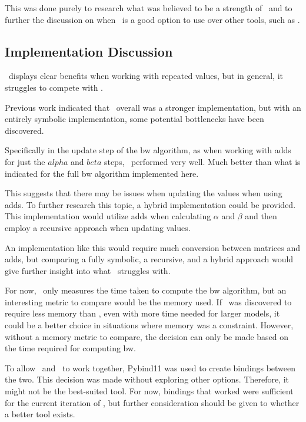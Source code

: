 This was done purely to research what was believed to be a strength of \Cupaal\ and to further the discussion on when \Cupaal\ is a good option to use over other tools, such as \Jajapy.


\subsection{Implementation Discussion} \label{subsec:implementation_discussion}
\Cupaal\ displays clear benefits when working with repeated values, but in general, it struggles to compete with \Jajapy.

Previous work indicated that \Cupaal\ overall was a stronger implementation, but with an entirely symbolic implementation, some potential bottlenecks have been discovered.

Specifically in the update step of the \gls{bw} algorithm, as when working with \glspl{add} for just the $alpha$ and $beta$ steps, \Cupaal\ performed very well.
Much better than what is indicated for the full \gls{bw} algorithm implemented here.

This suggests that there may be issues when updating the values when using \glspl{add}.
To further research this topic, a hybrid implementation could be provided.
This implementation would utilize \glspl{add} when calculating $\alpha$ and $\beta$ and then employ a recursive approach when updating values.

An implementation like this would require much conversion between matrices and \glspl{add}, but comparing a fully symbolic, a recursive, and a hybrid approach would give further insight into what \Cupaal\ struggles with.

For now, \Cupaal\ only measures the time taken to compute the \gls{bw} algorithm, but an interesting metric to compare would be the memory used.
If \Cupaal\ was discovered to require less memory than \Jajapy, even with more time needed for larger models, it could be a better choice in situations where memory was a constraint.
However, without a memory metric to compare, the decision can only be made based on the time required for computing \gls{bw}.

To allow \Cupaal\ and \Jajapy\ to work together, Pybind11 was used to create bindings between the two.
This decision was made without exploring other options. Therefore, it might not be the best-suited tool.
For now, bindings that worked were sufficient for the current iteration of \Cupaal, but further consideration should be given to whether a better tool exists.

